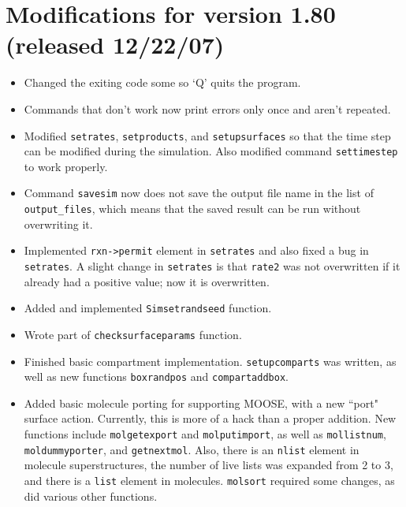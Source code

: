 \documentclass {scrbook}
\newcommand {\ttt} {\texttt}
\begin{document}
\section{Modifications for version 1.80 (released 12/22/07)}
\begin{itemize}
\item Changed the exiting code some so `Q' quits the program.
\item Commands that don't work now print errors only once and aren't repeated.
\item Modified \ttt{setrates}, \ttt{setproducts}, and \ttt{setupsurfaces} so that the time step can be modified during the simulation. Also modified command \ttt{settimestep} to work properly.
\item Command \ttt{savesim} now does not save the output file name in the list of \ttt{output\_files}, which means that the saved result can be run without overwriting it.
\item Implemented \ttt{rxn->permit} element in \ttt{setrates} and also fixed a bug in \ttt{setrates}. A slight change in \ttt{setrates} is that \ttt{rate2} was not overwritten if it already had a positive value; now it is overwritten.
\item Added and implemented \ttt{Simsetrandseed} function.
\item Wrote part of \ttt{checksurfaceparams} function.
\item Finished basic compartment implementation. \ttt{setupcomparts} was written, as well as new functions \ttt{boxrandpos} and \ttt{compartaddbox}.
\item Added basic molecule porting for supporting MOOSE, with a new ``port" surface action. Currently, this is more of a hack than a proper addition. New functions include \ttt{molgetexport} and \ttt{molputimport}, as well as \ttt{mollistnum}, \ttt{moldummyporter}, and \ttt{getnextmol}. Also, there is an \ttt{nlist} element in molecule superstructures, the number of live lists was expanded from 2 to 3, and there is a \ttt{list} element in molecules. \ttt{molsort} required some changes, as did various other functions.
\end{itemize}
\end{document}
